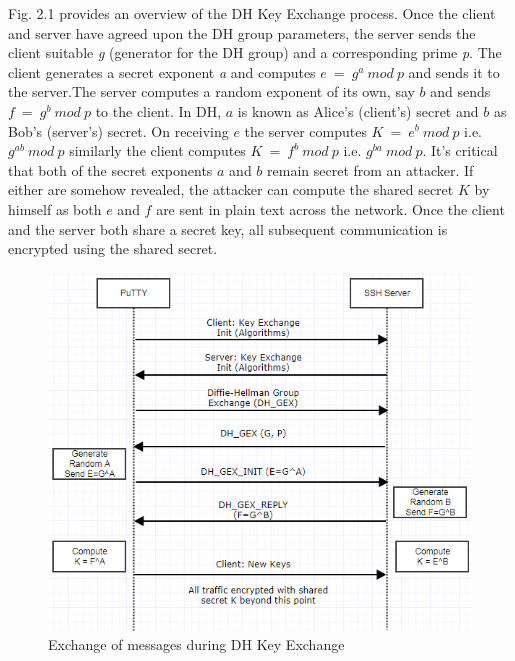 \documentclass{report}
\begin{document}
Fig. 2.1 provides an overview of the DH Key Exchange process. Once the client and server have agreed upon the DH group parameters, the server sends the client suitable \textit{g} (generator for the DH group) and a corresponding prime \textit{p}. The client generates a secret exponent \textit{a} and computes \(e\ = \ g^a\ mod\ p\) and sends it to the server.The server computes a random exponent of its own, say \(b\) and sends \(f\ =\ g^b\ mod\ p\) to the client. In DH, \(a\) is known as Alice's (client's) secret and \(b\) as Bob's (server's) secret. On receiving \(e\) the server computes \(K\ =\ e^b\ mod\ p\)  i.e. \(g^{ab} \ mod\ p\) similarly the client computes \(K\ =\ f^b\ mod\ p\) i.e. \(g^{ba}\ mod\ p\). It's critical that both of the secret exponents \(a\) and \(b\) remain secret from an attacker. If either are somehow revealed, the attacker can compute the shared secret \(K\) by himself as both \(e\) and \(f\) are sent in plain text across the network. Once the client and the server both share a secret key, all subsequent communication is encrypted using the shared secret.
\begin{figure}[ht]
\caption{Exchange of messages during DH Key Exchange}
\centering
\includegraphics[width=1\textwidth]{SSH_DH_KEX.png}
\end{figure}
\end{document}
